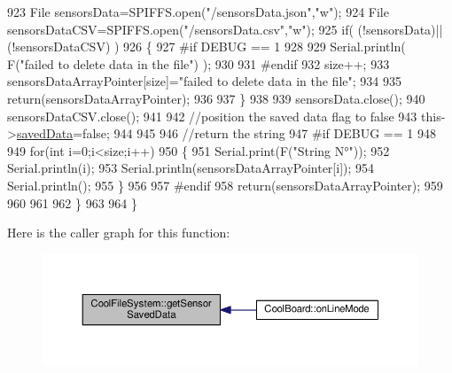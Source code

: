 \begin{DoxyCode}
923         File sensorsData=SPIFFS.open(\textcolor{stringliteral}{"/sensorsData.json"},\textcolor{stringliteral}{"w"});
924         File sensorsDataCSV=SPIFFS.open(\textcolor{stringliteral}{"/sensorsData.csv"},\textcolor{stringliteral}{"w"});
925         \textcolor{keywordflow}{if}( (!sensorsData)||(!sensorsDataCSV) ) 
926         \{
927 \textcolor{preprocessor}{        #if DEBUG == 1}
928     
929             Serial.println( F(\textcolor{stringliteral}{"failed to delete data in the file"}) );
930     
931 \textcolor{preprocessor}{        #endif}
932             size++;
933             sensorsDataArrayPointer[size]=\textcolor{stringliteral}{"failed to delete data in the file"};
934 
935             \textcolor{keywordflow}{return}(sensorsDataArrayPointer);
936 
937         \}
938 
939         sensorsData.close();
940         sensorsDataCSV.close();
941 
942         \textcolor{comment}{//position the saved data flag to false}
943         this->\hyperlink{classCoolFileSystem_ad398e0c5c41a0c88acdf5d672aa71351}{savedData}=\textcolor{keyword}{false}; 
944         
945 
946         \textcolor{comment}{//return the string}
947 \textcolor{preprocessor}{        #if DEBUG == 1}
948         
949             \textcolor{keywordflow}{for}(\textcolor{keywordtype}{int} i=0;i<size;i++)
950             \{
951                 Serial.print(F(\textcolor{stringliteral}{"String N°"}));
952                 Serial.println(i);
953                 Serial.println(sensorsDataArrayPointer[i]);
954                 Serial.println();           
955             \}
956     
957 \textcolor{preprocessor}{        #endif}
958         \textcolor{keywordflow}{return}(sensorsDataArrayPointer);
959         
960         
961         
962     \}
963 
964 \}
\end{DoxyCode}
Here is the caller graph for this function\+:\nopagebreak
\begin{figure}[H]
\begin{center}
\leavevmode
\includegraphics[width=350pt]{classCoolFileSystem_a3223ffff4266a6300988fab956d6b4b2_icgraph}
\end{center}
\end{figure}
\mbox{\label{classCoolFileSystem_a5a7eaeea7a9fbf8aaef651d862fa3b5b}} 
